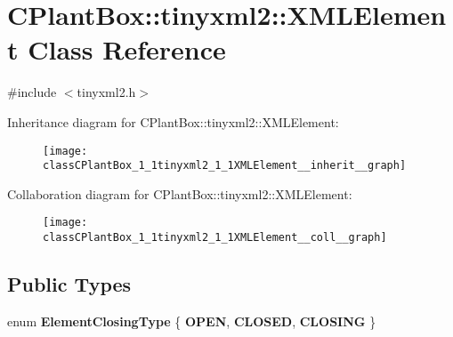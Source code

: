 \hypertarget{classCPlantBox_1_1tinyxml2_1_1XMLElement}{}\section{C\+Plant\+Box\+:\+:tinyxml2\+:\+:X\+M\+L\+Element Class Reference}
\label{classCPlantBox_1_1tinyxml2_1_1XMLElement}


{\ttfamily \#include $<$tinyxml2.\+h$>$}



Inheritance diagram for C\+Plant\+Box\+:\+:tinyxml2\+:\+:X\+M\+L\+Element\+:\nopagebreak
\begin{figure}[H]
\begin{center}
\leavevmode
\texttt{[image: classCPlantBox\_1\_1tinyxml2\_1\_1XMLElement\_\_inherit\_\_graph]}
\end{center}
\end{figure}


Collaboration diagram for C\+Plant\+Box\+:\+:tinyxml2\+:\+:X\+M\+L\+Element\+:\nopagebreak
\begin{figure}[H]
\begin{center}
\leavevmode
\texttt{[image: classCPlantBox\_1\_1tinyxml2\_1\_1XMLElement\_\_coll\_\_graph]}
\end{center}
\end{figure}
\subsection*{Public Types}
\begin{DoxyCompactItemize}
\item 
\mbox{\label{classCPlantBox_1_1tinyxml2_1_1XMLElement_a961937141c2d689d81bad2410fe8a497}} 
enum {\bfseries Element\+Closing\+Type} \{ {\bfseries O\+P\+EN}, 
{\bfseries C\+L\+O\+S\+ED}, 
{\bfseries C\+L\+O\+S\+I\+NG}
 \}
\end{DoxyCompactItemize}
